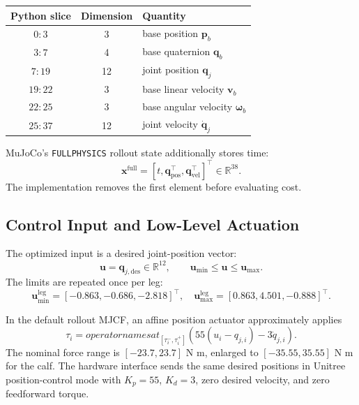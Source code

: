 \documentclass[11pt,a4paper]{article}
\newcommand{\R}{\mathbb{R}}
\newcommand{\code}[1]{\texttt{#1}}
\begin{document}
\begin{center}
\begin{tabular}{ccl}
\toprule
Python slice & Dimension & Quantity\\
\midrule
$0{:}3$   & 3  & base position $\bm{p}_b$\\
$3{:}7$   & 4  & base quaternion $\bm{q}_b$\\
$7{:}19$  & 12 & joint position $\bm{q}_j$\\
$19{:}22$ & 3  & base linear velocity $\bm{v}_b$\\
$22{:}25$ & 3  & base angular velocity $\bm{\omega}_b$\\
$25{:}37$ & 12 & joint velocity $\dot{\bm{q}}_j$\\
\bottomrule
\end{tabular}
\end{center}

MuJoCo's \code{FULLPHYSICS} rollout state additionally stores time:
\begin{equation}
  \bm{x}^{\mathrm{full}}=
  [t,\bm{q}_{\mathrm{pos}}^\top,\bm{q}_{\mathrm{vel}}^\top]^\top
  \in\R^{38}.
\end{equation}
The implementation removes the first element before evaluating cost.

\subsection{Control Input and Low-Level Actuation}

The optimized input is a desired joint-position vector:
\begin{equation}
  \boxed{\bm{u}=\bm{q}_{j,\mathrm{des}}\in\R^{12}},
  \qquad \bm{u}_{\min}\leq\bm{u}\leq\bm{u}_{\max}.
  \label{eq:input}
\end{equation}
The limits are repeated once per leg:
\begin{equation}
  \bm{u}_{\min}^{\mathrm{leg}}=
  [-0.863,-0.686,-2.818]^\top,
  \quad
  \bm{u}_{\max}^{\mathrm{leg}}=
  [0.863,4.501,-0.888]^\top.
\end{equation}

In the default rollout MJCF, an affine position actuator approximately applies
\begin{equation}
  \tau_i=operatorname{sat}_{[\tau_i^-,\tau_i^+]}
  \left(55(u_i-q_{j,i})-3\dot q_{j,i}\right).
  \label{eq:mjcf_pd}
\end{equation}
The nominal force range is $[-23.7,23.7]$ N m, enlarged to
$[-35.55,35.55]$ N m for the calf.  The hardware interface sends the same
desired positions in Unitree position-control mode with $K_p=55$, $K_d=3$,
zero desired velocity, and zero feedforward torque.
\end{document}
